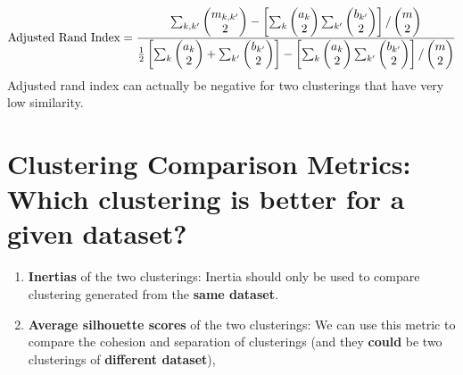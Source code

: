 \documentclass[11pt]{elegantbook}
\begin{document}
\begin{equation}
    \begin{aligned}
        \textnormal{Adjusted Rand Index}=\frac{\sum_{k,k'}\begin{pmatrix}
            m_{k,k'}\\
            2
        \end{pmatrix}-\left[\sum_k\begin{pmatrix}
            a_{k}\\
            2
        \end{pmatrix}\sum_{k'}\begin{pmatrix}
            b_{k'}\\
            2
        \end{pmatrix}\right]/\begin{pmatrix}
            m\\
            2
        \end{pmatrix}}{\frac{1}{2}\left[\sum_k\begin{pmatrix}
            a_{k}\\
            2
        \end{pmatrix}+\sum_{k'}\begin{pmatrix}
            b_{k'}\\
            2
        \end{pmatrix}\right]-\left[\sum_k\begin{pmatrix}
            a_{k}\\
            2
        \end{pmatrix}\sum_{k'}\begin{pmatrix}
            b_{k'}\\
            2
        \end{pmatrix}\right]/\begin{pmatrix}
            m\\
            2
        \end{pmatrix}}
    \end{aligned}
    \nonumber
\end{equation}
Adjusted rand index can actually be negative for two clusterings that have very low similarity.








\section{Clustering Comparison Metrics: Which clustering is better for a given dataset?}
\begin{enumerate}
    \item \textbf{Inertias} of the two clusterings:    Inertia should only be used to compare clustering generated from the \textbf{same dataset}.
    \item \textbf{Average silhouette scores} of the two clusterings: We can use this metric to compare the cohesion and separation of clusterings (and they \textbf{could} be two clusterings of \textbf{different dataset}),
\end{enumerate}
\end{document}
